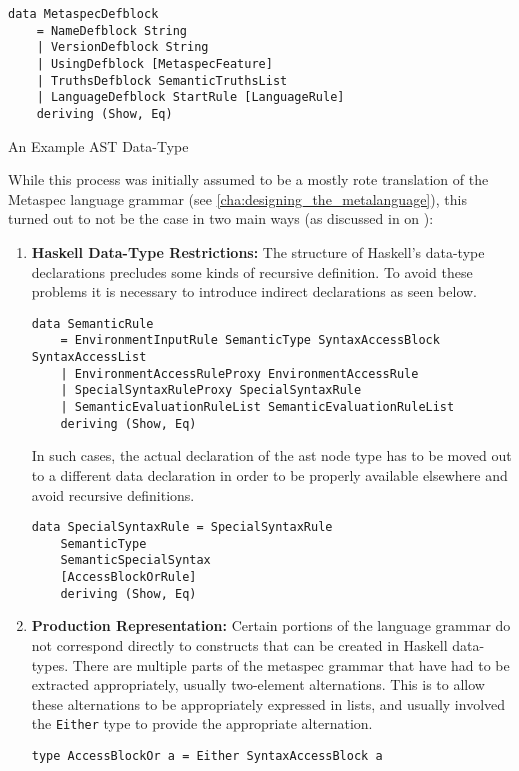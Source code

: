 \begin{listing}[!htb]
\begin{verbatim}
data MetaspecDefblock
    = NameDefblock String
    | VersionDefblock String
    | UsingDefblock [MetaspecFeature]
    | TruthsDefblock SemanticTruthsList
    | LanguageDefblock StartRule [LanguageRule]
    deriving (Show, Eq)    
\end{verbatim}
\caption{An Example AST Data-Type}
\label{lst:an_example_ast_data_type}
\end{listing}

While this process was initially assumed to be a mostly rote translation of the Metaspec language grammar (see \autoref{cha:designing_the_metalanguage}), this turned out to not be the case in two main ways (as discussed in  on ):
\begin{enumerate}
    \item \textbf{Haskell Data-Type Restrictions:} The structure of Haskell's data-type declarations precludes some kinds of recursive definition.
    To avoid these problems it is necessary to introduce indirect declarations as seen below.
\begin{verbatim}
data SemanticRule
    = EnvironmentInputRule SemanticType SyntaxAccessBlock SyntaxAccessList
    | EnvironmentAccessRuleProxy EnvironmentAccessRule
    | SpecialSyntaxRuleProxy SpecialSyntaxRule
    | SemanticEvaluationRuleList SemanticEvaluationRuleList
    deriving (Show, Eq)
\end{verbatim}
    In such cases, the actual declaration of the \gls{ast} node type has to be moved out to a different data declaration in order to be properly available elsewhere and avoid recursive definitions.
\begin{verbatim}
data SpecialSyntaxRule = SpecialSyntaxRule
    SemanticType
    SemanticSpecialSyntax
    [AccessBlockOrRule]
    deriving (Show, Eq)
\end{verbatim}
    \item \textbf{Production Representation:} Certain portions of the language grammar do not correspond directly to constructs that can be created in Haskell data-types.
    There are multiple parts of the \gls{metaspec} grammar that have had to be extracted appropriately, usually two-element alternations.
    This is to allow these alternations to be appropriately expressed in lists, and usually involved the \texttt{Either} type to provide the appropriate alternation.
\begin{verbatim}
type AccessBlockOr a = Either SyntaxAccessBlock a
\end{verbatim}
\end{enumerate}

